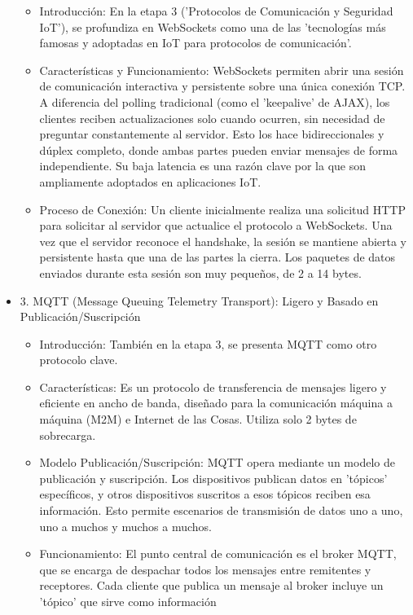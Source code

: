 \documentclass{report}
\begin{document}
\begin{itemize}
    \begin{itemize}
        \item Introducción: En la etapa 3 ('Protocolos de Comunicación y Seguridad IoT'), se profundiza en WebSockets como una de 
        las 'tecnologías más famosas y adoptadas en IoT para protocolos de comunicación'.
        \item Características y Funcionamiento: WebSockets permiten abrir una sesión de comunicación interactiva y persistente sobre 
        una única conexión TCP. A diferencia del polling tradicional (como el 'keepalive' de AJAX), los clientes reciben actualizaciones 
        solo cuando ocurren, sin necesidad de preguntar constantemente al servidor. Esto los hace bidireccionales y dúplex completo, 
        donde ambas partes pueden enviar mensajes de forma independiente. Su baja latencia es una razón clave por la que son ampliamente 
        adoptados en aplicaciones IoT.
        \item Proceso de Conexión: Un cliente inicialmente realiza una solicitud HTTP para solicitar al servidor que actualice el protocolo 
        a WebSockets. Una vez que el servidor reconoce el handshake, la sesión se mantiene abierta y persistente hasta que una de las partes 
        la cierra. Los paquetes de datos enviados durante esta sesión son muy pequeños, de 2 a 14 bytes.
    \end{itemize}
    \item 3. MQTT (Message Queuing Telemetry Transport): Ligero y Basado en Publicación/Suscripción
    \begin{itemize}
        \item Introducción: También en la etapa 3, se presenta MQTT como otro protocolo clave.
        \item Características: Es un protocolo de transferencia de mensajes ligero y eficiente en ancho de banda, diseñado para 
        la comunicación máquina a máquina (M2M) e Internet de las Cosas. Utiliza solo 2 bytes de sobrecarga.
        \item Modelo Publicación/Suscripción: MQTT opera mediante un modelo de publicación y suscripción. Los dispositivos publican 
        datos en 'tópicos' específicos, y otros dispositivos suscritos a esos tópicos reciben esa información. Esto permite escenarios 
        de transmisión de datos uno a uno, uno a muchos y muchos a muchos.
        \item Funcionamiento: El punto central de comunicación es el broker MQTT, que se encarga de despachar todos los mensajes 
        entre remitentes y receptores. Cada cliente que publica un mensaje al broker incluye un 'tópico' que sirve como información 

\end{itemize}
\end{itemize}
\end{document}
